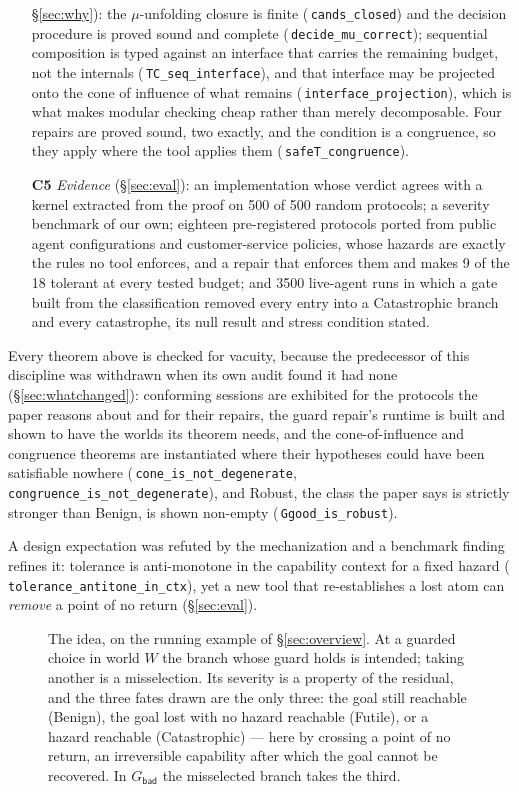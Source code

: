 \documentclass[a4paper,UKenglish,cleveref,autoref,thm-restate,anonymous]{lipics-v2021}
\newcommand{\Rob}{\textsf{Robust}}
\newcommand{\Ben}{\textsf{Benign}}
\newcommand{\Fut}{\textsf{Futile}}
\newcommand{\Cat}{\textsf{Catastrophic}}
\newcommand{\coqok}[1]{\textcolor{okgreen}{\ding{51}}\,\texttt{\small #1}}
\begin{document}
\begin{itemize}
  \S\ref{sec:why}): the $\mu$-unfolding closure is finite
  (\coqok{cands\_closed}) and the decision procedure is proved sound and
  complete (\coqok{decide\_mu\_correct}); sequential composition is typed
  against an interface that carries the remaining budget, not the internals
  (\coqok{TC\_seq\_interface}), and that interface may be projected onto the
  cone of influence of what remains (\coqok{interface\_projection}), which is
  what makes modular checking cheap rather than merely decomposable. Four
  repairs are proved sound, two exactly, and the condition is a congruence, so
  they apply where the tool applies them (\coqok{safeT\_congruence}).
\item[\textbf{C5}] \emph{Evidence} (\S\ref{sec:eval}): an implementation whose
  verdict agrees with a kernel extracted from the proof on 500 of 500 random
  protocols; a severity benchmark of our own; eighteen pre-registered protocols
  ported from public agent configurations and customer-service policies, whose
  hazards are exactly the rules no tool enforces, and a repair that enforces them
  and makes 9 of the 18 tolerant at every tested budget; and 3500 live-agent runs
  in which a gate built from the classification removed every entry into a \Cat{}
  branch and every catastrophe, its null result and stress condition stated.
\end{itemize}
Every theorem above is checked for vacuity, because the predecessor of this
discipline was withdrawn when its own audit found it had none
(\S\ref{sec:whatchanged}): conforming sessions are exhibited for the protocols
the paper reasons about and for their repairs, the guard repair's runtime is
built and shown to have the worlds its theorem needs, and the cone-of-influence
and congruence theorems are instantiated where their hypotheses could have been
satisfiable nowhere (\coqok{cone\_is\_not\_degenerate},
\coqok{congruence\_is\_not\_degenerate}), and \Rob{}, the class the paper
says is strictly stronger than \Ben{}, is shown non-empty
(\coqok{Ggood\_is\_robust}).

A design expectation was refuted by the mechanization and a benchmark
finding refines it: tolerance is anti-monotone in the capability context for
a fixed hazard (\coqok{tolerance\_antitone\_in\_ctx}), yet a new tool that
re-establishes a lost atom can \emph{remove} a point of no return
(\S\ref{sec:eval}).

\begin{figure}[t]
\centering
\resizebox{\textwidth}{!}{}
\caption{The idea, on the running example of \S\ref{sec:overview}. At a guarded
choice in world $W$ the branch whose guard holds is intended; taking another is
a misselection. Its severity is a property of the residual, and the three fates
drawn are the only three: the goal still reachable (\Ben), the goal lost with
no hazard reachable (\Fut), or a hazard reachable (\Cat) --- here by crossing a
point of no return, an irreversible capability after which the goal cannot be
recovered. In $G_{\mathsf{bad}}$ the misselected branch takes the third.}
\label{fig:idea}
\end{figure}
\end{document}
